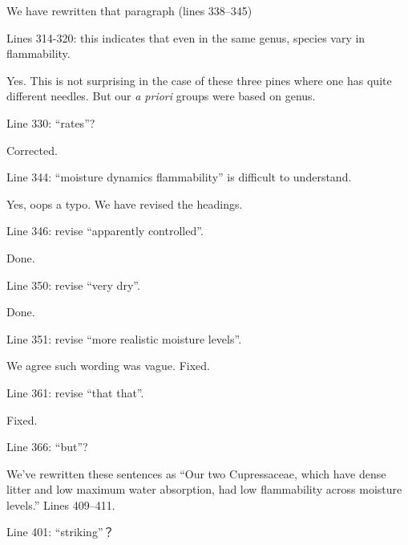 \documentclass[letterpaper, 12pt]{letter}
\begin{document}
\begin{letter}{}
We have rewritten that paragraph (lines 338--345)

\begin{quoting}
  Lines 314-320: this indicates that even in the same genus, species vary in
  flammability.
\end{quoting}

Yes. This is not surprising in the case of these three pines where one has
quite different needles. But our \emph{a priori} groups were based on genus. 

\begin{quoting}
Line 330: “rates”?
\end{quoting}

Corrected.

\begin{quoting}
  Line 344: “moisture dynamics flammability” is difficult to understand.
\end{quoting}

Yes, oops a typo. We have revised the headings.

\begin{quoting}
  Line 346: revise “apparently controlled”.
\end{quoting}

Done.

\begin{quoting}
  Line 350: revise “very dry”.
\end{quoting}

Done.

\begin{quoting}
Line 351: revise “more realistic moisture levels”.
\end{quoting}

We agree such wording was vague. Fixed.

\begin{quoting}
  Line 361: revise “that that”.
\end{quoting}

Fixed.

\begin{quoting}
  Line 366: “but”?
\end{quoting}

We've rewritten these sentences as ``Our two Cupressaceae, which have dense
litter and low maximum water absorption, had low flammability across moisture
levels.'' Lines 409--411.

\begin{quoting}
  Line 401: “striking”？
\end{quoting}


\end{letter}
\end{document}
